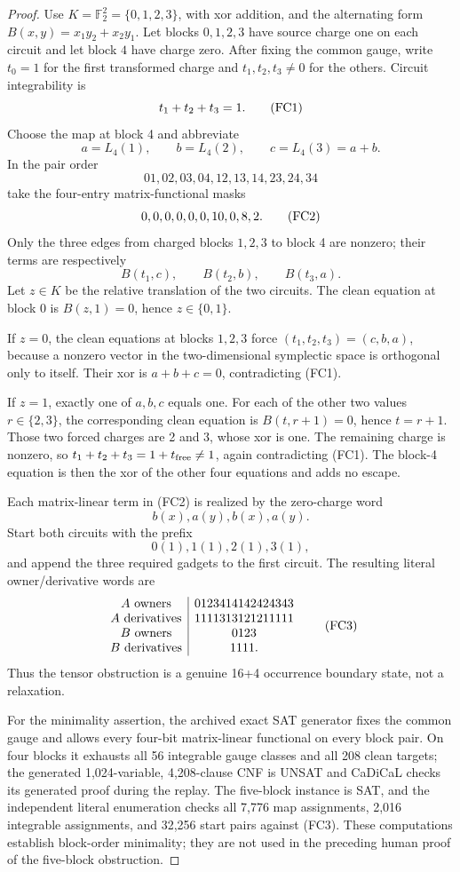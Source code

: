 \documentclass[11pt]{article}
\theoremstyle{definition}
\theoremstyle{remark}
\newcommand{\F}{\mathbb F}
\begin{document}
\begin{proof}
Use \(K=\F_2^2=\{0,1,2,3\}\), with xor addition, and the alternating form
\(B(x,y)=x_1y_2+x_2y_1\).  Let blocks \(0,1,2,3\) have source charge one
on each circuit and let block \(4\) have charge zero.  After fixing the
common gauge, write \(t_0=1\) for the first transformed charge and
\(t_1,t_2,t_3\ne0\) for the others.  Circuit integrability is
\[
                         t_1+t_2+t_3=1. \qquad\text{\rm(FC1)}
\]
Choose the map at block 4 and abbreviate
\[
 a=L_4(1),\qquad b=L_4(2),\qquad c=L_4(3)=a+b.
\]
In the pair order
\[
01,02,03,04,12,13,14,23,24,34
\]
take the four-entry matrix-functional masks
\[
                  0,0,0,0,0,0,10,0,8,2. \qquad\text{\rm(FC2)}
\]
Only the three edges from charged blocks \(1,2,3\) to block 4 are
nonzero; their terms are respectively
\[
                         B(t_1,c),\qquad B(t_2,b),\qquad B(t_3,a).
\]
Let \(z\in K\) be the relative translation of the two circuits.  The
clean equation at block 0 is \(B(z,1)=0\), hence \(z\in\{0,1\}\).

If \(z=0\), the clean equations at blocks \(1,2,3\) force
\((t_1,t_2,t_3)=(c,b,a)\), because a nonzero vector in the two-dimensional
symplectic space is orthogonal only to itself.  Their xor is
\(a+b+c=0\), contradicting (FC1).

If \(z=1\), exactly one of \(a,b,c\) equals one.  For each of the other
two values \(r\in\{2,3\}\), the corresponding clean equation is
\(B(t,r+1)=0\), hence \(t=r+1\).  Those two forced charges are 2 and 3,
whose xor is one.  The remaining charge is nonzero, so
\(t_1+t_2+t_3=1+t_{\rm free}\ne1\), again contradicting (FC1).  The
block-4 equation is then the xor of the other four equations and adds no
escape.

Each matrix-linear term in (FC2) is realized by the zero-charge word
\[
                         b(x),a(y),b(x),a(y).
\]
Start both circuits with the prefix
\[
                         0(1),1(1),2(1),3(1),
\]
and append the three required gadgets to the first circuit.  The resulting
literal owner/derivative words are
\[
\begin{array}{c|c}
A\text{ owners}&0123414142424343\\
A\text{ derivatives}&1111313121211111\\
B\text{ owners}&0123\\
B\text{ derivatives}&1111.
\end{array}
\qquad\text{\rm(FC3)}
\]
Thus the tensor obstruction is a genuine 16+4 occurrence boundary
state, not a relaxation.

For the minimality assertion, the archived exact SAT generator fixes the
common gauge and allows every four-bit matrix-linear functional on every
block pair.  On four blocks it exhausts all 56 integrable gauge classes and
all 208 clean targets; the generated 1,024-variable, 4,208-clause CNF is
UNSAT and CaDiCaL checks its generated proof during the replay.  The
five-block instance is SAT,
and the independent literal enumeration checks all 7,776 map assignments,
2,016 integrable assignments, and 32,256 start pairs against (FC3).
These computations establish block-order minimality; they are not used in
the preceding human proof of the five-block obstruction.
\end{proof}
\end{document}
